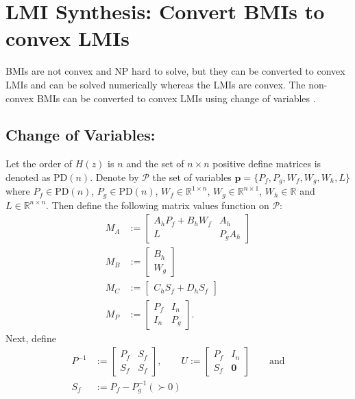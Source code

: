 \documentclass[a4paper]{article}
\begin{document}
\section{LMI Synthesis: Convert BMIs to convex LMIs}
BMIs are not convex and NP hard to solve, but they can be converted to convex LMIs  and can be solved numerically whereas the LMIs are convex. The non-convex BMIs can be converted to convex LMIs using change of variables \cite{Izumi1998}. 
\subsection*{Change of Variables:}
Let the order of $H(z)$ is $n$ and the set of $n \times n$ positive define matrices is denoted as $\textrm{PD}(n)$. Denote by $\mathcal{P}$ the set of variables $\mathbf{p} = \{P_{f}, P_{g}, W_{f}, W_{g}, W_{h}, L\}$ where $P_{f} \in \textrm{PD}(n)$,  $P_{g} \in \textrm{PD}(n)$, $W_{f} \in \mathbb{R}^{1 \times n}$,  $W_{g} \in \mathbb{R}^{n \times 1}$, $W_{h} \in \mathbb{R}$ and $L \in \mathbb{R}^{n \times n}$. Then define the following matrix values function on $\mathcal{P}$:
\begin{equation}
	\begin{aligned}
		M_{A}&:= \begin{bmatrix}
			A_{h} P_{f} + B_{h} W_{f} & A_{h} \\
			L & P_{g} A_{h}
		\end{bmatrix} \\
		M_{B} &:= \begin{bmatrix}
			B_{h} \\ W_{g}
		\end{bmatrix} \\
		M_{C} &:= \begin{bmatrix}
			C_{h}S_{f} + D_{h}S_{f}
		\end{bmatrix} \\
		M_{P} &:= \begin{bmatrix}
			P_{f} & I_{n} \\
			I_{n} & P_{g}
		\end{bmatrix}.
	\end{aligned}	
\end{equation}
Next, define 
\begin{align}
	{P}^{-1} &:= \begin{bmatrix}
		P_{f} & S_{f} \\
		S_{f} & S_{f}
	\end{bmatrix} ,
	\qquad
	U := \begin{bmatrix}
		P_f & I_{n} \\
		S_{f} & \mathbf{0}
	\end{bmatrix} \qquad \textrm{and} \\
	S_{f} &:= P_{f} - P_{g}^{-1} ( \succ 0)
\end{align}
\end{document}
